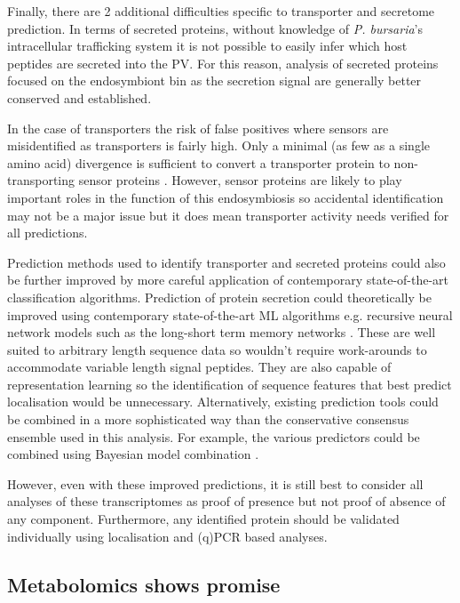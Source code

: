 Finally, there are 2 additional difficulties specific to transporter and secretome prediction.
In terms of secreted proteins, without knowledge of \textit{P. bursaria}'s intracellular trafficking
system it is not possible to easily infer which host peptides are secreted into
the PV.  For this reason, analysis of secreted proteins focused on 
the endosymbiont bin as the secretion signal are generally better conserved
and established. 

In the case of transporters the risk of false positives where sensors are 
misidentified as transporters is fairly high. 
Only a minimal (as few as
a single amino acid) divergence is sufficient to convert a transporter protein 
to non-transporting sensor proteins \citep{Lalonde1999,Bianchi2010}.
However, sensor proteins are likely to play important roles in the function
of this endosymbiosis so accidental identification may not be a major issue but
it does mean transporter activity needs verified for all predictions.


Prediction methods used to identify
transporter and secreted proteins 
could also be further improved by more careful 
application of contemporary state-of-the-art classification
algorithms. 
Prediction of protein secretion could theoretically be improved
using contemporary state-of-the-art ML algorithms e.g. recursive
neural network models such as the long-short term memory networks 
\citep{Hochreiter1997,Greff2015}.
These are well suited to arbitrary length sequence data so wouldn't 
require work-arounds to accommodate variable length signal 
peptides.  They are also capable of representation learning
so the identification of sequence features that best
predict localisation would be unnecessary. 
Alternatively, existing prediction tools could be combined
in a more sophisticated way than the conservative consensus
ensemble used in this analysis.  For example,
the various predictors could be combined using Bayesian
model combination \citep{Monteith2011}.


However, even with these improved predictions, it is still 
best to consider all analyses
of these transcriptomes as proof of presence but not proof of absence
of any component. Furthermore, any identified protein should be validated
individually using localisation and (q)PCR based analyses.


\subsection{Metabolomics shows promise}

